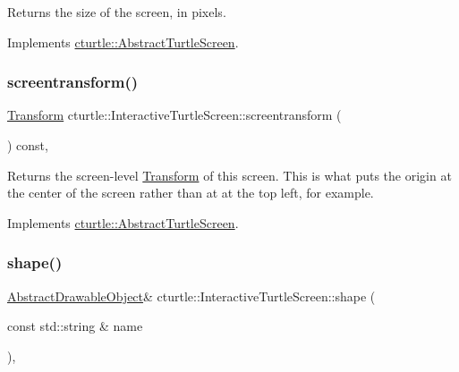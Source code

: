 Returns the size of the screen, in pixels. 

Implements \hyperlink{classcturtle_1_1AbstractTurtleScreen}{cturtle\+::\+Abstract\+Turtle\+Screen}.

\mbox{\label{classcturtle_1_1InteractiveTurtleScreen_a6c81f204488e1ebe8180504990e559dc}} 
\subsubsection{\texorpdfstring{screentransform()}{screentransform()}}
{\footnotesize\ttfamily \hyperlink{classcturtle_1_1Transform}{Transform} cturtle\+::\+Interactive\+Turtle\+Screen\+::screentransform (\begin{DoxyParamCaption}{ }\end{DoxyParamCaption}) const\hspace{0.3cm}{\ttfamily [inline]}, {\ttfamily [virtual]}}

Returns the screen-\/level \hyperlink{classcturtle_1_1Transform}{Transform} of this screen. This is what puts the origin at the center of the screen rather than at at the top left, for example. 

Implements \hyperlink{classcturtle_1_1AbstractTurtleScreen}{cturtle\+::\+Abstract\+Turtle\+Screen}.

\mbox{\label{classcturtle_1_1InteractiveTurtleScreen_ae855fb3d2acd831ce751e9387b8edc06}} 
\subsubsection{\texorpdfstring{shape()}{shape()}}
{\footnotesize\ttfamily \hyperlink{classcturtle_1_1AbstractDrawableObject}{Abstract\+Drawable\+Object}\& cturtle\+::\+Interactive\+Turtle\+Screen\+::shape (\begin{DoxyParamCaption}\item[{const std\+::string \&}]{name }\end{DoxyParamCaption})\hspace{0.3cm}{\ttfamily [inline]}, {\ttfamily [virtual]}}

